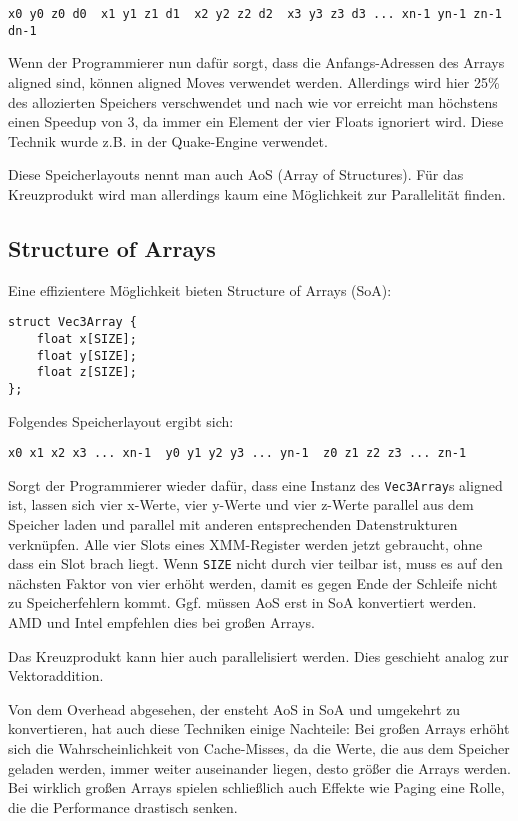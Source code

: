 \documentclass[a4paper,10pt]{article}
\begin{document}
\begin{verbatim}
x0 y0 z0 d0  x1 y1 z1 d1  x2 y2 z2 d2  x3 y3 z3 d3 ... xn-1 yn-1 zn-1 dn-1
\end{verbatim}

Wenn der Programmierer nun dafür sorgt, dass die Anfangs-Adressen des Arrays aligned sind, können
aligned Moves verwendet werden. Allerdings wird hier 25\% des allozierten Speichers verschwendet und
nach wie vor erreicht man höchstens einen Speedup von 3, da immer ein Element der vier Floats
ignoriert wird. Diese Technik wurde z.B. in der Quake-Engine verwendet.

Diese Speicherlayouts nennt man auch AoS (Array of Structures). Für das Kreuzprodukt wird man allerdings
kaum eine Möglichkeit zur Parallelität finden.

\subsection{Structure of Arrays}

Eine effizientere Möglichkeit bieten Structure of Arrays (SoA):

\begin{verbatim}
struct Vec3Array {
    float x[SIZE];
    float y[SIZE];
    float z[SIZE];
};
\end{verbatim}

Folgendes Speicherlayout ergibt sich:

\begin{verbatim}
x0 x1 x2 x3 ... xn-1  y0 y1 y2 y3 ... yn-1  z0 z1 z2 z3 ... zn-1
\end{verbatim}

Sorgt der Programmierer wieder dafür, dass eine Instanz des \texttt{Vec3Array}s aligned ist, lassen sich vier
x-Werte, vier y-Werte und vier z-Werte parallel aus dem Speicher laden und parallel mit anderen
entsprechenden Datenstrukturen verknüpfen. Alle vier Slots eines XMM-Register werden jetzt
gebraucht, ohne dass ein Slot brach liegt. Wenn \texttt{SIZE} nicht durch vier teilbar ist, muss es
auf den nächsten Faktor von vier erhöht werden, damit es gegen Ende der Schleife nicht zu
Speicherfehlern kommt. Ggf. müssen AoS erst in SoA konvertiert werden. AMD und Intel empfehlen dies
bei großen Arrays. 

Das Kreuzprodukt kann hier auch parallelisiert werden. Dies geschieht analog zur Vektoraddition.

Von dem Overhead abgesehen, der ensteht AoS in SoA und umgekehrt zu konvertieren, hat auch diese
Techniken einige Nachteile: Bei großen Arrays erhöht sich die Wahrscheinlichkeit von Cache-Misses, da
die Werte, die aus dem Speicher geladen werden, immer weiter auseinander liegen, desto größer die
Arrays werden. Bei wirklich großen Arrays spielen schließlich auch Effekte wie Paging eine Rolle,
die die Performance drastisch senken.
\end{document}
